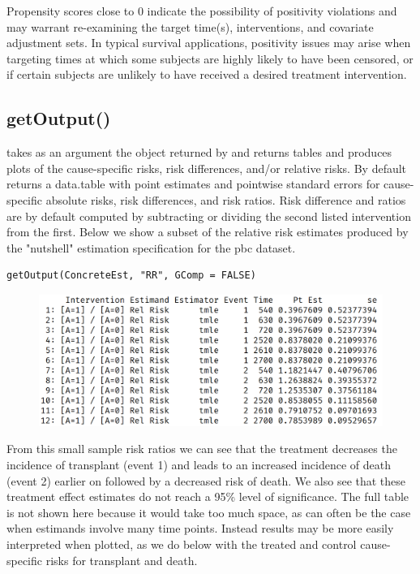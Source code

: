 \documentclass{report}
\newcommand{\1}{\ensuremath{\mathbf{1}}}
\begin{document}
Propensity scores close to 0 indicate the possibility of positivity violations and may warrant re-examining the target time(s), interventions, and covariate adjustment sets. In typical survival applications, positivity issues may arise when targeting times at which some subjects are highly likely to have been censored, or if certain subjects are unlikely to have received a desired treatment intervention.

\subsection{getOutput()}
\label{getoutput}
 takes as an argument the  object returned by  and returns tables and produces plots of the cause-specific risks, risk differences, and/or relative risks. By default  returns a data.table with point estimates and pointwise standard errors for cause-specific absolute risks, risk differences, and risk ratios. Risk difference and ratios are by default computed by subtracting or dividing the second listed intervention from the first. Below we show a subset of the relative risk estimates produced by the "nutshell" estimation specification for the pbc dataset. 

\begin{lstlisting}
getOutput(ConcreteEst, "RR", GComp = FALSE)
\end{lstlisting}

\begin{figure}[H]
\centering
\includegraphics[width=.7\linewidth]{fig/rr-tbl.png}
\end{figure}

From this small sample risk ratios we can see that the treatment decreases the incidence of transplant (event 1) and leads to an increased incidence of death (event 2) earlier on followed by a decreased risk of death. We also see that these treatment effect estimates do not reach a 95\% level of significance. The full table is not shown here because it would take too much space, as can often be the case when estimands involve many time points. Instead results may be more easily interpreted when plotted, as we do below with the treated and control cause-specific risks for transplant and death.
\end{document}
